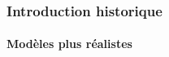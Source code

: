 %
%


\begin{frame}
\frametitle{Introduction historique}
\framesubtitle{Modèles plus réalistes}


 
\end{frame}
